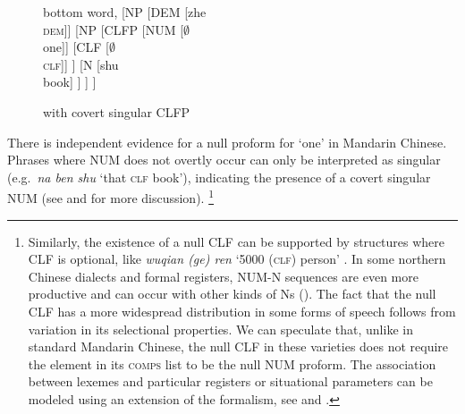 \documentclass[output=paper,colorlinks,citecolor=brown]{langscibook}
\begin{document}
\begin{figure}
  \centering
		\begin{forest}
			bottom word,
	[NP
		[DEM [zhe \\ \textsc{dem}]]
		[NP
			[CLFP
				[NUM [$\emptyset$ \\ one]]
			[CLF [$\emptyset$ \\ \textsc{clf}]]
			]
			[N
				[shu\\book]
			]
		]
	]
		\end{forest}
  \caption{ with covert singular CLFP}
  \label{fig:sing-dem:deng}
\end{figure}

There is independent evidence for a null proform for `one'  in Mandarin Chinese.  Phrases where NUM does not overtly occur can only be interpreted as singular (e.g.\ \textit{na ben shu} `that \textsc{clf} book'), indicating the presence of a covert singular NUM  (see \citealt{Heratal15a} and \citealt[183--187]{Zhang2019a} for more discussion).%
%
\footnote{Similarly, the existence of a null CLF can be supported by structures where CLF is optional, like \textit{wuqian (ge) ren} `5000 (\textsc{clf}) person'  \citep[1669]{Her12a}. In some northern Chinese dialects and formal registers, NUM-N sequences are even more productive and can occur with other kinds of Ns (\citealt{Heratal15a}).  
The fact that the null CLF has a more widespread distribution in some forms of speech follows from variation in its selectional properties. We can speculate that, unlike in standard Mandarin Chinese, the null CLF in these varieties does not require the element in its \textsc{comps} list to be the null NUM proform. The association between lexemes and particular registers or situational parameters can be modeled using an extension of the  formalism, see \citet{MyP&Co22a}  and \citet{Varaschin&Co24a}.}  
%
\end{document}
